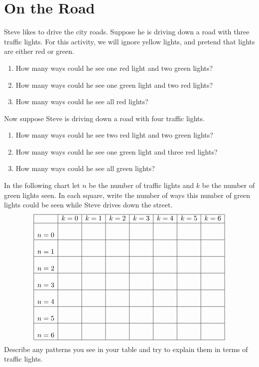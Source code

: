 \newpage
\section{On the Road}\label{A:traffic}


\begin{prob} 
Steve likes to drive the city roads. Suppose he is driving down a road
with three traffic lights. For this activity, we will ignore yellow
lights, and pretend that lights are either red or green.
\begin{enumerate}
\item How many ways could he see one red light and two green lights?
\item How many ways could he see one green light and two red lights?
\item How many ways could he see all red lights?
\end{enumerate}
\end{prob}

\begin{prob} 
Now suppose Steve is driving down a road with four traffic lights.
\begin{enumerate}
\item How many ways could he see two red light and two green lights?
\item How many ways could he see one green light and three red lights?
\item How many ways could he see all green lights?
\end{enumerate}
\end{prob}

\begin{prob} 
In the following chart let $n$ be the number of traffic
lights and $k$ be  the number of green lights seen. In each square, write the number of ways this number of green lights could be seen while Steve drives down the street.
\newpage
{} 
\[
\begin{array}{|c|c|c|c|c|c|c|c|}
    \hline
          & k=0 & k=1 & k=2 & k=3 & k=4 & k=5 & k = 6\\
    \hline
    n=0 &\rule[0mm]{0mm}{7mm}&       &       &       &       &   &   \\
    \hline
    n=1 &\rule[0mm]{0mm}{7mm}  &       &       &       &       &   &   \\
    \hline
    n=2 & \rule[0mm]{0mm}{7mm} &     &     &       &       &    &  \\
    \hline
    n=3 &\rule[0mm]{0mm}{7mm}       &       &       &       &       &   &   \\
    \hline
    n=4 & \rule[0mm]{0mm}{7mm}      &       &       &       &       &   &   \\
    \hline
    n=5 &\rule[0mm]{0mm}{7mm}       &       &       &       &       &   &   \\
    \hline
    n=6 &\rule[0mm]{0mm}{7mm}       &       &       &       &       &   &   \\
    \hline
\end{array}
\]
Describe any patterns you see in your table and try to explain them in
terms of traffic lights.
\end{prob}

